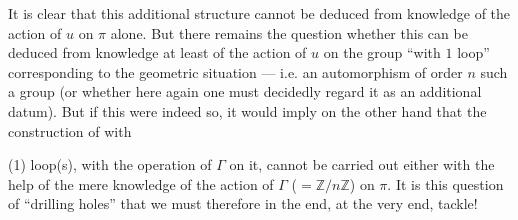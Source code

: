 It is clear that this additional structure cannot be deduced
from knowledge of the action of \(u\) on \(\pi\) alone.
But there remains the question whether this 
can be deduced from knowledge at least of the
 action of \(u\) on the group
``with \(1\) loop'' corresponding to the geometric situation
--- i.e. an  automorphism
 of order \(n\)  such a group
(or whether here again one must decidedly regard it as an additional
datum).
But if this were indeed so, it would imply on the other hand that the
construction of  with



(1) loop(s), with the operation of \(\Gamma\) on it, cannot be carried out
either with the help of the mere 
knowledge of the action of \(\Gamma\) (\(=\mathbb Z/n\mathbb Z\))
on \(\pi\).
It is this question of ``drilling holes'' that we must therefore in the end,
at the very end, tackle!

